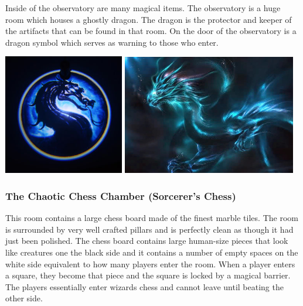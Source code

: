 Inside of the observatory are many magical items. The observatory is a huge room which houses a ghostly dragon. The dragon is the protector and keeper of the artifacts that can be found in that room. On the door of the observatory is a dragon symbol which serves as warning to those who enter.

\begin{center}
	\includegraphics[width=0.395\textwidth]{img/Karazhan/s-l300.jpg}
	\includegraphics[width=0.57\textwidth]{img/Karazhan/Cloud_dragon.jpg}
\end{center}

\subsubsection{The Chaotic Chess Chamber (Sorcerer's Chess)}

This room contains a large chess board made of the finest marble tiles. The room is surrounded by very well crafted pillars and is perfectly clean as though it had just been polished. The chess board contains large human-size pieces that look like creatures one the black side and it contains a number of empty spaces on the white side equivalent to how many players enter the room. When a player enters a square, they become that piece and the square is locked by a magical barrier. The players essentially enter wizards chess and cannot leave until beating the other side.

